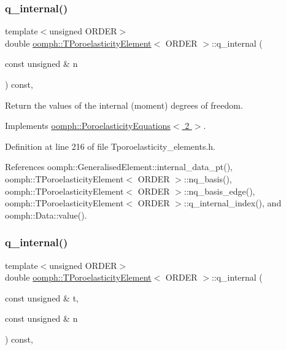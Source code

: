 \subsubsection{\texorpdfstring{q\+\_\+internal()}{q\_internal()}\hspace{0.1cm}{\footnotesize\ttfamily [1/2]}}
{\footnotesize\ttfamily template$<$unsigned O\+R\+D\+ER$>$ \\
double \hyperlink{classoomph_1_1TPoroelasticityElement}{oomph\+::\+T\+Poroelasticity\+Element}$<$ O\+R\+D\+ER $>$\+::q\+\_\+internal (\begin{DoxyParamCaption}\item[{const unsigned \&}]{n }\end{DoxyParamCaption}) const\hspace{0.3cm}{\ttfamily [inline]}, {\ttfamily [virtual]}}



Return the values of the internal (moment) degrees of freedom. 



Implements \hyperlink{classoomph_1_1PoroelasticityEquations_a95ed7bb3ad2efe901453f99f1e42c0a6}{oomph\+::\+Poroelasticity\+Equations$<$ 2 $>$}.



Definition at line 216 of file Tporoelasticity\+\_\+elements.\+h.



References oomph\+::\+Generalised\+Element\+::internal\+\_\+data\+\_\+pt(), oomph\+::\+T\+Poroelasticity\+Element$<$ O\+R\+D\+E\+R $>$\+::nq\+\_\+basis(), oomph\+::\+T\+Poroelasticity\+Element$<$ O\+R\+D\+E\+R $>$\+::nq\+\_\+basis\+\_\+edge(), oomph\+::\+T\+Poroelasticity\+Element$<$ O\+R\+D\+E\+R $>$\+::q\+\_\+internal\+\_\+index(), and oomph\+::\+Data\+::value().

\mbox{\label{classoomph_1_1TPoroelasticityElement_a6ac708ffa8850ca009ccedbb651a3152}} 
\subsubsection{\texorpdfstring{q\+\_\+internal()}{q\_internal()}\hspace{0.1cm}{\footnotesize\ttfamily [2/2]}}
{\footnotesize\ttfamily template$<$unsigned O\+R\+D\+ER$>$ \\
double \hyperlink{classoomph_1_1TPoroelasticityElement}{oomph\+::\+T\+Poroelasticity\+Element}$<$ O\+R\+D\+ER $>$\+::q\+\_\+internal (\begin{DoxyParamCaption}\item[{const unsigned \&}]{t,  }\item[{const unsigned \&}]{n }\end{DoxyParamCaption}) const\hspace{0.3cm}{\ttfamily [inline]}, {\ttfamily [virtual]}}



